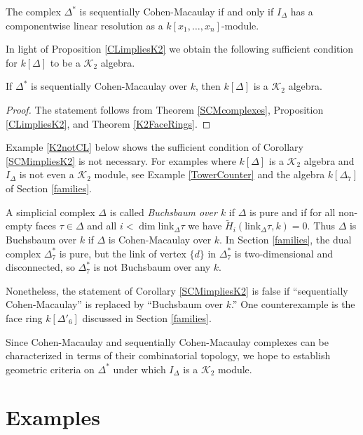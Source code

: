 \documentclass[11pt,righttag]{amsart}
\begin{document}
\begin{thm}[\cite{HH}]
\label{SCMcomplexes}
The complex ${\Delta}^*$ is sequentially Cohen-Macaulay if and only if  $I_{\Delta}$ has a componentwise linear resolution as a $k[x_1,\ldots,x_n]$-module.
\end{thm}

In light of Proposition \ref{CLimpliesK2} we obtain the following sufficient condition for $k[{\Delta}]$ to be a ${{\mathcal K}}_2$ algebra.

\begin{cor}
\label{SCMimpliesK2}
If $\Delta^*$ is sequentially Cohen-Macaulay over $k$, then $k[{\Delta}]$ is a ${{\mathcal K}}_2$ algebra.
\end{cor}

\begin{proof}
The statement follows from Theorem \ref{SCMcomplexes}, Proposition \ref{CLimpliesK2}, and Theorem \ref{K2FaceRings}.

\end{proof}

Example \ref{K2notCL} below shows the sufficient condition of Corollary \ref{SCMimpliesK2} is not necessary. For examples where $k[{\Delta}]$ is a ${{\mathcal K}}_2$ algebra and $I_{\Delta}$ is not even a ${{\mathcal K}}_2$ module, see Example \ref{TowerCounter} and the algebra $k[{\Delta}_7]$ of Section \ref{families}.

A simplicial complex ${\Delta}$ is called \emph{Buchsbaum over $k$} if ${\Delta}$ is pure and if for all non-empty faces ${\tau}\in{\Delta}$ and all $i<\dim {\text{link}}_{\Delta} {\tau}$ we have $\widetilde{H}_i({\text{link}}_{\Delta}{\tau}, k)=0$. Thus ${\Delta}$ is Buchsbaum over $k$ if ${\Delta}$ is Cohen-Macaulay over $k$.  In Section \ref{families}, the dual complex ${\Delta}_7^*$ is pure, but the link of vertex $\{d\}$ in ${\Delta}_7^*$ is two-dimensional and disconnected, so ${\Delta}_7^*$ is not Buchsbaum over any $k$. 

Nonetheless, the statement of Corollary \ref{SCMimpliesK2} is false if ``sequentially Cohen-Macaulay'' is replaced by ``Buchsbaum over $k$.''  One counterexample is the face ring $k[{\Delta}'_6]$ discussed in Section \ref{families}.
 
Since Cohen-Macaulay and sequentially Cohen-Macaulay  complexes can be characterized in terms of their combinatorial topology, we hope to establish geometric criteria on ${\Delta}^*$ under which $I_{\Delta}$ is a ${{\mathcal K}}_2$ module. 

\section{Examples}
\label{examples}
\end{document}

